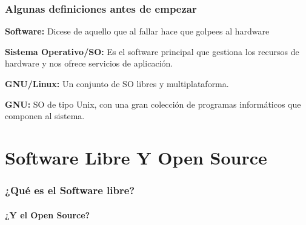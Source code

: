 \documentclass{beamer}
\begin{document}
    \begin{frame}
        \frametitle{Algunas definiciones antes de empezar}
    
            \textbf{Software:} Dicese de aquello que al fallar
            hace que golpees al hardware
       
            \textbf{Sistema Operativo/SO:} Es el software principal que gestiona 
            los recursos de hardware y nos ofrece servicios de aplicación. 
      
            \textbf{GNU/Linux:}  Un conjunto de SO libres y multiplataforma.
       
            \textbf{GNU:} SO de tipo Unix, con una gran colección de 
            programas informáticos que componen al sistema.
        
      
    \end{frame}
    \section{Software Libre Y Open Source}
    \begin{frame}
        \frametitle{¿Qué es el Software libre?}
        \framesubtitle{¿Y el Open Source?}
        
    \end{frame}


\end{document}
